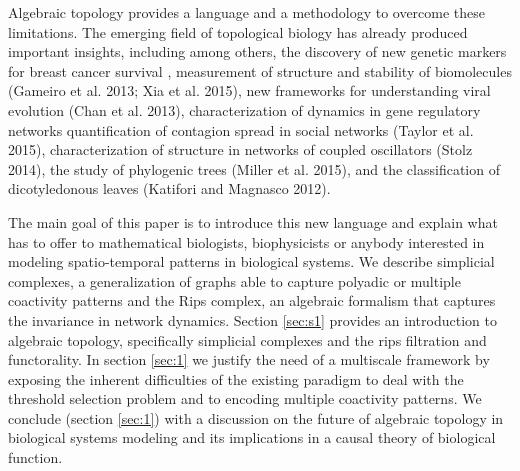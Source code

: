 \documentclass[onecollarge,runningheads]{svjour2}
\begin{document}
Algebraic topology \cite{munkres1984elements} provides a language and a methodology to overcome these limitations.
The emerging field of topological biology has already produced important insights, including among others, the discovery of new genetic markers for breast cancer survival \cite{nicolau2011topology}, measurement of structure and stability of biomolecules (Gameiro et al. 2013; Xia et al. 2015), new frameworks for understanding viral evolution (Chan et al. 2013), characterization of dynamics in gene regulatory networks \cite{boczko2005structure} quantification of contagion spread in social networks (Taylor et al. 2015), characterization of structure in networks of coupled oscillators (Stolz 2014), the study of phylogenic trees (Miller et al. 2015), and the classification of dicotyledonous leaves (Katifori and Magnasco 2012). 

The main goal of this paper is to introduce this new language and explain what has to offer to mathematical biologists, biophysicists or anybody interested in modeling spatio-temporal patterns in biological systems.
We describe simplicial complexes, a generalization of graphs able to capture polyadic or multiple coactivity patterns and the Rips complex, an algebraic formalism that captures the invariance in network dynamics. %
Section \ref{sec:s1} provides an introduction to algebraic topology, specifically simplicial complexes and the rips filtration and functorality. In section \ref{sec:1} we justify the need of a multiscale framework by exposing the inherent difficulties of the existing paradigm to deal with the threshold selection problem and to encoding multiple coactivity patterns.
We conclude (section \ref{sec:1}) with a discussion on the future of algebraic topology in biological systems modeling and its implications in a causal theory of biological function.

\end{document}
